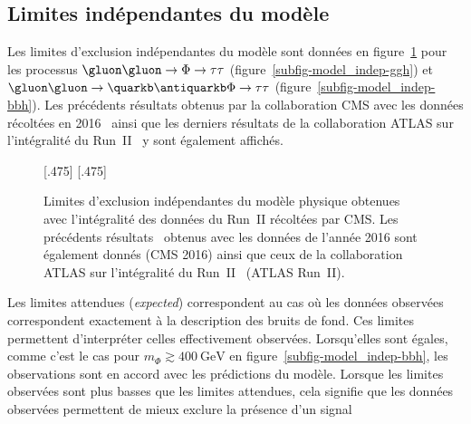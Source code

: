 \subsection{Limites indépendantes du modèle}
Les limites d'exclusion indépendantes du modèle sont données en figure~\ref{fig-model_indep}
pour les processus
$\gluon\gluon\to\Phi\to\tau\tau$ (figure~\ref{subfig-model_indep-ggh})
et
$\gluon\gluon\to\quarkb\antiquarkb\Phi\to\tau\tau$ (figure~\ref{subfig-model_indep-bbh}).
Les précédents résultats obtenus par la collaboration CMS avec les données récoltées en 2016~\cite{CMS-PAS-HIG-17-020}
ainsi que les derniers résultats de la collaboration ATLAS sur l'intégralité du Run~II~\cite{ATLAS-MSSM-HTT_2020} y sont également affichés.
\begin{figure}[h]
\centering

[.475\textwidth]
{}
\hfill
{}[.475\textwidth]
{}


\caption[Limites d'exclusion indépendantes.]{Limites d'exclusion indépendantes du modèle physique obtenues avec l'intégralité des données du Run~II récoltées par CMS. Les précédents résultats~\cite{CMS-PAS-HIG-17-020} obtenus avec les données de l'année 2016 sont également donnés (CMS 2016) ainsi que ceux de la collaboration ATLAS sur l'intégralité du Run~II~\cite{ATLAS-MSSM-HTT_2020} (ATLAS Run~II).}
\label{fig-model_indep}
\end{figure}
\par
Les limites attendues (\emph{expected}) correspondent au cas où
les données observées correspondent exactement à la description des bruits de fond.
Ces limites permettent d'interpréter celles effectivement observées.
Lorsqu'elles sont égales,
comme c'est le cas pour $m_{\Phi}\gtrsim\SI{400}{\GeV}$ en figure~\ref{subfig-model_indep-bbh},
les observations sont en accord avec les prédictions du modèle.
Lorsque les limites observées sont plus basses que les limites attendues,
cela signifie que les données observées permettent de mieux exclure la présence d'un signal
